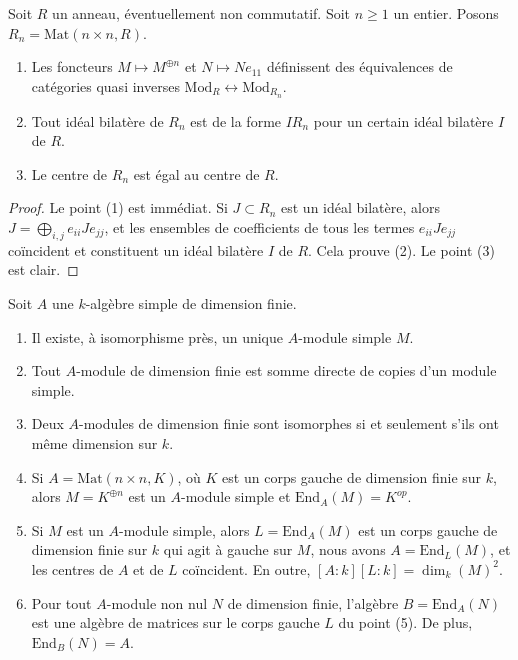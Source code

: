 \begin{lemma}
\label{lemma-matrix-algebras}
Soit $R$ un anneau, éventuellement non commutatif. Soit $n \geq 1$ un entier.
Posons $R_n = \text{Mat}(n \times n, R)$.
\begin{enumerate}
\item Les foncteurs $M \mapsto M^{\oplus n}$ et
$N \mapsto Ne_{11}$ définissent des équivalences de catégories quasi inverses
$\text{Mod}_R \leftrightarrow \text{Mod}_{R_n}$.
\item Tout idéal bilatère de $R_n$ est de la forme $IR_n$ pour un certain
idéal bilatère $I$ de $R$.
\item Le centre de $R_n$ est égal au centre de $R$.
\end{enumerate}
\end{lemma}

\begin{proof}
Le point (1) est immédiat. Si $J \subset R_n$ est un idéal bilatère, alors
$J = \bigoplus_{i,j} e_{ii}Je_{jj}$, et les ensembles de coefficients de tous les
termes $e_{ii}Je_{jj}$ coïncident et constituent un idéal bilatère $I$ de $R$.
Cela prouve (2).
Le point (3) est clair.
\end{proof}

\begin{lemma}
\label{lemma-simple-module-unique}
Soit $A$ une $k$-algèbre simple de dimension finie.
\begin{enumerate}
\item Il existe, à isomorphisme près, un unique $A$-module simple $M$.
\item Tout $A$-module de dimension finie est somme directe de copies
d'un module simple.
\item Deux $A$-modules de dimension finie sont isomorphes si et
seulement s'ils ont même dimension sur $k$.
\item Si $A = \text{Mat}(n \times n, K)$, où $K$ est un corps gauche de
dimension finie sur $k$, alors $M = K^{\oplus n}$ est un $A$-module simple et
$\text{End}_A(M) = K^{op}$.
\item Si $M$ est un $A$-module simple, alors $L = \text{End}_A(M)$ est un
corps gauche de dimension finie sur $k$ qui agit à gauche sur $M$, nous avons
$A = \text{End}_L(M)$, et les centres de $A$ et de $L$ coïncident.
En outre, $[A : k] [L : k] = \dim_k(M)^2$.
\item Pour tout $A$-module non nul $N$ de dimension finie, l'algèbre
$B = \text{End}_A(N)$ est une algèbre de matrices sur le corps gauche $L$ du
point (5). De plus, $\text{End}_B(N) = A$.
\end{enumerate}
\end{lemma}

